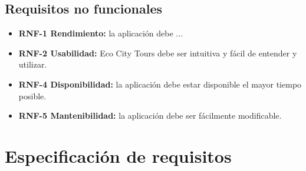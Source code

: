 \subsection{Requisitos no funcionales}
\begin{itemize}
	\item \textbf{RNF-1 Rendimiento:} la aplicación debe ...  
	\item \textbf{RNF-2 Usabilidad:} Eco City Tours debe ser intuitiva y fácil de entender y utilizar.  
	\item \textbf{RNF-4 Disponibilidad:} la aplicación debe estar disponible el mayor tiempo posible.
	\item \textbf{RNF-5 Mantenibilidad:} la aplicación debe ser fácilmente modificable.
\end{itemize}
\section{Especificación de requisitos}


